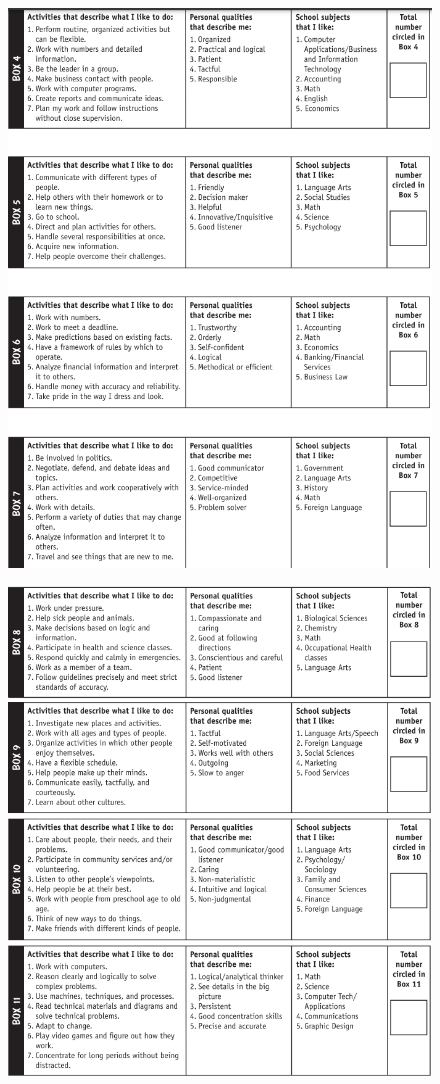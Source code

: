 \begin{figure}[H]
    \centering
    \includegraphics[width=0.9\linewidth,height= 0.8\textheight]{images/CC2.png}
\end{figure}

\begin{figure}[H]
    \centering
    \includegraphics[width=0.9\linewidth,height= 0.8\textheight]{images/CC3.png}
\end{figure}

